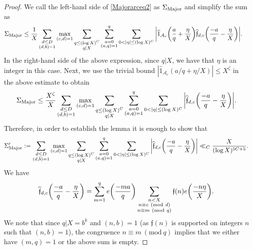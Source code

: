 \documentclass[12pt]{amsart}
\numberwithin{equation}{section}
\theoremstyle{remark}
\theoremstyle{definition}
\newcommand{\imod}[1]{\ (\mathrm{mod}\ #1)}
\begin{document}
\begin{proof}
 We call the left-hand side of \eqref{Majorarceq2} as $\Sigma_{\textup{Major}}$ and simplify the sum as
\begin{align}\notag
\Sigma_{\textup{Major}} & \leq \dfrac{1}{X}\sum_{\substack{d\leq D\\(d,b)=1}}\max_{(c,d)=1}\sum_{\substack{q\leq (\log X)^C\\q|X}}\sum_{\substack{a=0\\(a,q)=1}}^q\sum_{0<|\eta|\leq (\log X)^C}\bigg|\widehat{1}_{\mathcal{A}_r}\bigg(\dfrac{a}{q}+\dfrac{\eta}{X}\bigg)\widehat{\mathfrak{f}}_{d,c}\bigg(\dfrac{-a}{q}-\dfrac{\eta}{X}\bigg)\bigg|.
\end{align}
In the right-hand side of the above expression, since $q|X$, we have that $\eta$ is an integer in this case. Next, we use the trivial bound $|\widehat{1}_{\mathcal{A}_r}(a/q+\eta/X)|\leq X^{\zeta}$ in the above estimate to obtain
\begin{align}\label{inner0}
\Sigma_{\textup{Major}} \leq \dfrac{X^{\zeta}}{X}\sum_{\substack{d\leq D\\(d,b)=1}}\max_{(c,d)=1}\sum_{\substack{q\leq (\log X)^C\\q|X}}\sum_{\substack{a=0\\(a,q)=1}}^q\sum_{0<|\eta|\leq (\log X)^C}\bigg|\widehat{\mathfrak{f}}_{d,c}\bigg(\dfrac{-a}{q}-\dfrac{\eta}{X}\bigg)\bigg|.
\end{align}
 Therefore, in order to establish the lemma it is enough to show that
 \begin{align}\notag
\Sigma_{\textup{Major}}':=\sum_{\substack{d\leq D\\(d,b)=1}}\max_{(c,d)=1}\sum_{\substack{q\leq (\log X)^C\\q|X}}\sum_{\substack{a=0\\(a, q)=1}}^q\sum_{0<|\eta|\leq (\log X)^C}\bigg|\widehat{\mathfrak{f}}_{d,c}\bigg(\dfrac{-a}{q}-\dfrac{\eta}{X}\bigg)\bigg| \ll_{C}\dfrac{X}{(\log X)^{5C+5}}.
 \end{align}
 We have
\begin{align}
\notag \widehat{\mathfrak{f}}_{d,c}\bigg(\dfrac{-a}{q}-\dfrac{\eta}{X}\bigg)=\sum_{\substack{m=1}}^qe\bigg(\dfrac{-ma}{q}\bigg)\sum_{\substack{n<X\\n\equiv c\imod {d}\\ n\equiv m\imod q}}\mathfrak{f}(n)e\bigg(\dfrac{-n \eta }{X}\bigg).
\end{align}
We note that since $q|X = b^k$ and $(n, b)=1$ (as $\mathfrak{f}(n)$ is supported on integers $n$ such that $(n , b)=1$), the congruence $n\equiv m\imod q$ implies that we either have $(m, q)=1$ or the above sum is empty.

\end{proof}
\end{document}
